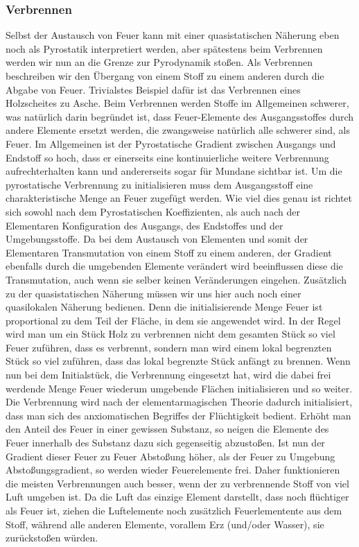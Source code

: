 \documentclass[a5paper,8pt]{book}
\begin{document}
\subsubsection{Verbrennen}

Selbst der Austausch von Feuer kann mit einer quasistatischen Näherung eben noch als Pyrostatik interpretiert werden, aber 
spätestens beim Verbrennen werden wir nun an die Grenze zur Pyrodynamik stoßen.
Als Verbrennen beschreiben wir den Übergang von einem Stoff zu einem anderen durch die Abgabe von Feuer. Trivialstes 
Beispiel dafür ist das Verbrennen eines Holzscheites zu Asche.
Beim Verbrennen werden Stoffe im Allgemeinen schwerer, was natürlich darin begründet ist, dass Feuer-Elemente des 
Ausgangsstoffes durch andere Elemente ersetzt werden, die zwangsweise natürlich alle schwerer sind, als Feuer.
Im Allgemeinen ist der Pyrostatische Gradient zwischen Ausgangs und Endstoff so hoch, dass er einerseits eine 
kontinuierliche weitere Verbrennung aufrechterhalten kann und andererseits sogar für Mundane sichtbar ist.
Um die pyrostatische Verbrennung zu initialisieren muss dem Ausgangsstoff eine charakteristische Menge an Feuer zugefügt 
werden. Wie viel dies genau ist richtet sich sowohl nach dem Pyrostatischen Koeffizienten, als auch nach der Elementaren 
Konfiguration des Ausgangs, des Endstoffes und der Umgebungsstoffe. Da bei dem Austausch von Elementen und somit der 
Elementaren Transmutation von einem Stoff zu einem anderen, der Gradient ebenfalls durch die umgebenden Elemente verändert
wird beeinflussen diese die Transmutation, auch wenn sie selber keinen Veränderungen eingehen.
Zusätzlich zu der quasistatischen Näherung müssen wir uns hier auch noch einer quasilokalen Näherung bedienen. Denn die 
initialisierende Menge Feuer ist proportional zu dem Teil der Fläche, in dem sie angewendet wird. In der Regel wird man um 
ein Stück Holz zu verbrennen nicht dem gesamten Stück so viel Feuer zuführen, dass es verbrennt, sondern man wird einem 
lokal begrenzten Stück so viel zuführen, dass das lokal begrenzte Stück anfängt zu brennen. Wenn nun bei dem Initialstück, 
die Verbrennung eingesetzt hat, wird die dabei frei werdende Menge Feuer wiederum umgebende Flächen initialisieren und so 
weiter.
Die Verbrennung wird nach der elementarmagischen Theorie dadurch initialisiert, dass man sich des anxiomatischen Begriffes 
der Flüchtigkeit bedient. Erhöht man den Anteil des Feuer in einer gewissen Substanz, so neigen die Elemente des Feuer 
innerhalb des Substanz dazu sich gegenseitig abzustoßen. Ist nun der Gradient dieser Feuer zu Feuer Abstoßung höher, als 
der Feuer zu Umgebung Abstoßungsgradient, so werden wieder Feuerelemente frei. Daher funktionieren die meisten 
Verbrennungen auch besser, wenn der zu verbrennende Stoff von viel Luft umgeben ist. Da die Luft das einzige Element 
darstellt, dass noch flüchtiger als Feuer ist, ziehen die Luftelemente noch zusätzlich Feuerlementente aus dem Stoff,
während alle anderen Elemente, vorallem Erz (und/oder Wasser), sie zurückstoßen würden.
\end{document}
